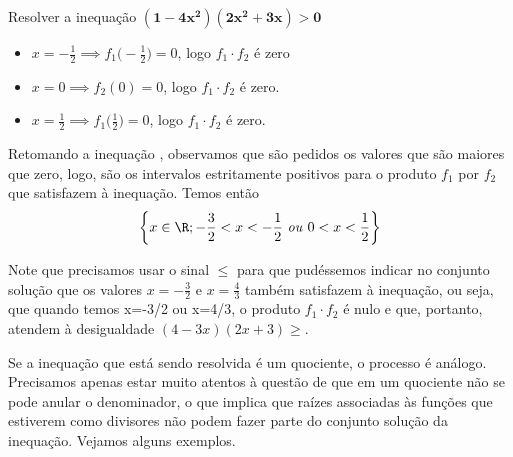 \begin{example}{Resolver a inequação $\bm{(1-4x^2)(2x^2+3x)>0}$}
\begin{itemize}[topsep=0pt,itemsep=0pt]
\item $x=-\frac{1}{2}\implies f_1\big(-\frac{1}{2}\big)=0$, logo $f_1\cdot f_2$ é zero
\item $x=0\implies f_2(0)=0$, logo $f_1\cdot f_2$ é zero.
\item $x=\frac{1}{2}\implies f_1\big(\frac{1}{2}\big)=0$, logo $f_1\cdot f_2$ é zero.
\end{itemize}

Retomando a inequação , observamos que são pedidos os valores que são maiores que zero, logo, são os intervalos estritamente positivos para o produto $f_1$ por $f_2$  que satisfazem à inequação. Temos então
\begin{equation*}
\left \{
x\in\R; -\frac{3}{2}<x<-\frac{1}{2}\text{ \textit{ou} }0<x<\frac{1}{2}
\right\}
\end{equation*}

\end{example}

\begin{observation}
Note que precisamos usar o sinal $\leq$ para que pudéssemos indicar no conjunto solução que os valores $x=-\frac{3}{2}$ e $x=\frac{4}{3}$ também satisfazem à inequação, ou seja, que quando temos x=-3/2 ou x=4/3, o produto $f_1\cdot f_2$ é nulo e que, portanto, atendem à desigualdade $(4-3x)(2x+3)\geq$.
\end{observation}

Se a inequação que está sendo resolvida é um quociente, o processo é análogo. Precisamos apenas estar muito atentos à questão de que em um quociente não se pode anular o denominador, o que implica que raízes associadas às funções que estiverem como divisores não podem fazer parte do conjunto solução da inequação. Vejamos alguns exemplos.

